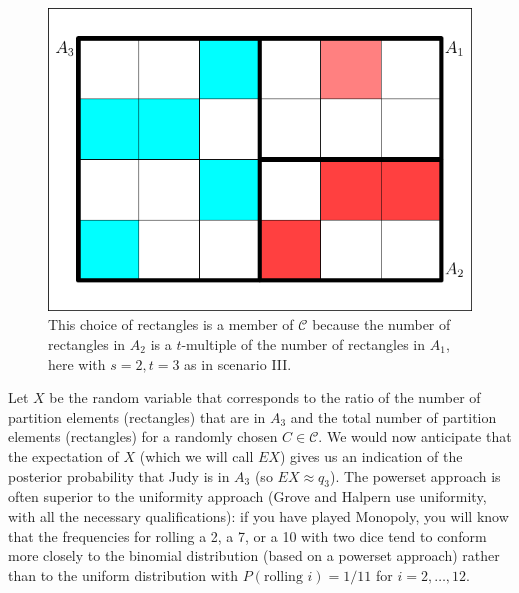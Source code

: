 \documentclass[12pt]{article}
\def\lwv{.6}
\begin{document}
\begin{figure}[h]
  \begin{flushright}
    \begin{minipage}[h]{\lwv\linewidth}
      \includegraphics[width=\textwidth]{partition-1.pdf}
      \caption{This choice of rectangles is a member of
        $\mathcal{C}$ because the number of rectangles in $A_{2}$ is
        a $t$-multiple of the number of rectangles in $A_{1}$,
        here with $s=2,t=3$ as in scenario III.}
      \label{fig:pwstex2}
    \end{minipage}
  \end{flushright}
\end{figure}

Let $X$ be the random variable that corresponds to the ratio of the
number of partition elements (rectangles) that are in $A_{3}$ and the
total number of partition elements (rectangles) for a randomly chosen
$C\in\mathcal{C}$. We would now anticipate that the expectation of $X$
(which we will call $EX$) gives us an indication of the posterior
probability that Judy is in $A_{3}$ (so $EX\approx{}q_{3}$). The powerset
approach is often superior to the uniformity approach (Grove and
Halpern use uniformity, with all the necessary qualifications): if you
have played Monopoly, you will know that the frequencies for rolling a
2, a 7, or a 10 with two dice tend to conform more closely to the
binomial distribution (based on a powerset approach) rather than to
the uniform distribution with $P(\mbox{rolling }i)=1/11$ for
$i=2,{\ldots},12$.
\end{document}
